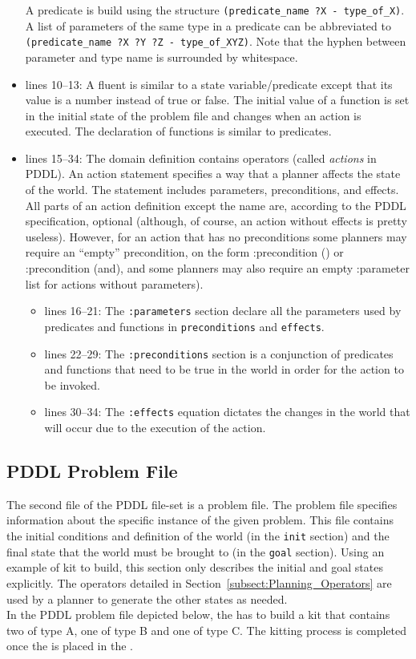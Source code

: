 \begin{itemize}
    A predicate is build using the structure \texttt{(predicate\_name ?X - type\_of\_X)}. A list of parameters of the same type in a predicate can be abbreviated to \texttt{(predicate\_name ?X ?Y ?Z - type\_of\_XYZ)}. Note that the hyphen between parameter and type name is surrounded by whitespace.
\item lines 10--13: A fluent is similar to a state variable/predicate except that its value is a number instead of true or false. The initial value of a function is set in the initial state of the problem file and changes when an action is executed. The declaration of functions is similar to predicates.
\item lines 15--34: The domain definition contains operators (called \textit{actions} in PDDL). An action statement specifies a way that a planner affects the state of the world. The statement includes parameters, preconditions, and effects. All parts of an action definition except the name are, according to the PDDL specification, optional (although, of course, an action without effects is pretty useless). However, for an action that has no preconditions some planners may require an ``empty'' precondition, on the form :precondition () or :precondition (and), and some planners may also require an empty :parameter list for actions without parameters).
\begin{itemize}
\item lines 16--21: The \texttt{:parameters} section declare all the parameters used by predicates and functions in \texttt{preconditions} and \texttt{effects}.
\item lines 22--29: The \texttt{:preconditions} section is a conjunction of predicates and functions that need to be true in the world in order for the action to be invoked.
\item lines 30--34: The \texttt{:effects} equation dictates the changes in the world that will occur due to the execution of the action.
\end{itemize}
\end{itemize}


\subsection{PDDL Problem File}\label{S:PDDL-problem}
The second file of the PDDL file-set is a  problem file. The problem file specifies information about the specific instance of the given problem. This file contains the initial conditions and definition of the world (in the \texttt{init} section) and the final state that the world must be brought to (in the \texttt{goal} section). Using an example of kit to build, this section only describes the initial and goal states explicitly. The operators detailed in Section~\ref{subsect:Planning_Operators} are used by a planner to generate the other states as needed.\\
In the PDDL problem file depicted below, the  has to build a kit that contains two  of type A, one  of type B and one  of type C. The kitting process is completed once the  is placed in the .

